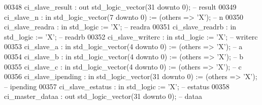 \begin{DoxyCode}
00348             ci\_slave\_result     : \textcolor{keywordflow}{out} \textcolor{comment}{std\_logic\_vector}(\textcolor{vhdllogic}{}\textcolor{vhdllogic}{31} \textcolor{keywordflow}{downto} \textcolor{vhdllogic}{}\textcolor{vhdllogic}{0});                    \textcolor{keyword}{-- result}
00349             ci\_slave\_n          : \textcolor{keywordflow}{in}  \textcolor{comment}{std\_logic\_vector}(\textcolor{vhdllogic}{}\textcolor{vhdllogic}{7} \textcolor{keywordflow}{downto} \textcolor{vhdllogic}{}\textcolor{vhdllogic}{0})  := (\textcolor{keywordflow}{others} => 'X'); \textcolor{keyword}{-- n}
00350             ci\_slave\_readra     : \textcolor{keywordflow}{in}  \textcolor{comment}{std\_logic}                     := 'X';             \textcolor{keyword}{-- readra}
00351             ci\_slave\_readrb     : \textcolor{keywordflow}{in}  \textcolor{comment}{std\_logic}                     := 'X';             \textcolor{keyword}{-- readrb}
00352             ci\_slave\_writerc    : \textcolor{keywordflow}{in}  \textcolor{comment}{std\_logic}                     := 'X';             \textcolor{keyword}{-- writerc}
00353             ci\_slave\_a          : \textcolor{keywordflow}{in}  \textcolor{comment}{std\_logic\_vector}(\textcolor{vhdllogic}{}\textcolor{vhdllogic}{4} \textcolor{keywordflow}{downto} \textcolor{vhdllogic}{}\textcolor{vhdllogic}{0})  := (\textcolor{keywordflow}{others} => 'X'); \textcolor{keyword}{-- a}
00354             ci\_slave\_b          : \textcolor{keywordflow}{in}  \textcolor{comment}{std\_logic\_vector}(\textcolor{vhdllogic}{}\textcolor{vhdllogic}{4} \textcolor{keywordflow}{downto} \textcolor{vhdllogic}{}\textcolor{vhdllogic}{0})  := (\textcolor{keywordflow}{others} => 'X'); \textcolor{keyword}{-- b}
00355             ci\_slave\_c          : \textcolor{keywordflow}{in}  \textcolor{comment}{std\_logic\_vector}(\textcolor{vhdllogic}{}\textcolor{vhdllogic}{4} \textcolor{keywordflow}{downto} \textcolor{vhdllogic}{}\textcolor{vhdllogic}{0})  := (\textcolor{keywordflow}{others} => 'X'); \textcolor{keyword}{-- c}
00356             ci\_slave\_ipending   : \textcolor{keywordflow}{in}  \textcolor{comment}{std\_logic\_vector}(\textcolor{vhdllogic}{}\textcolor{vhdllogic}{31} \textcolor{keywordflow}{downto} \textcolor{vhdllogic}{}\textcolor{vhdllogic}{0}) := (\textcolor{keywordflow}{others} => 'X'); \textcolor{keyword}{-- ipending}
00357             ci\_slave\_estatus    : \textcolor{keywordflow}{in}  \textcolor{comment}{std\_logic}                     := 'X';             \textcolor{keyword}{-- estatus}
00358             ci\_master\_dataa     : \textcolor{keywordflow}{out} \textcolor{comment}{std\_logic\_vector}(\textcolor{vhdllogic}{}\textcolor{vhdllogic}{31} \textcolor{keywordflow}{downto} \textcolor{vhdllogic}{}\textcolor{vhdllogic}{0});                    \textcolor{keyword}{-- dataa}

\end{DoxyCode}
